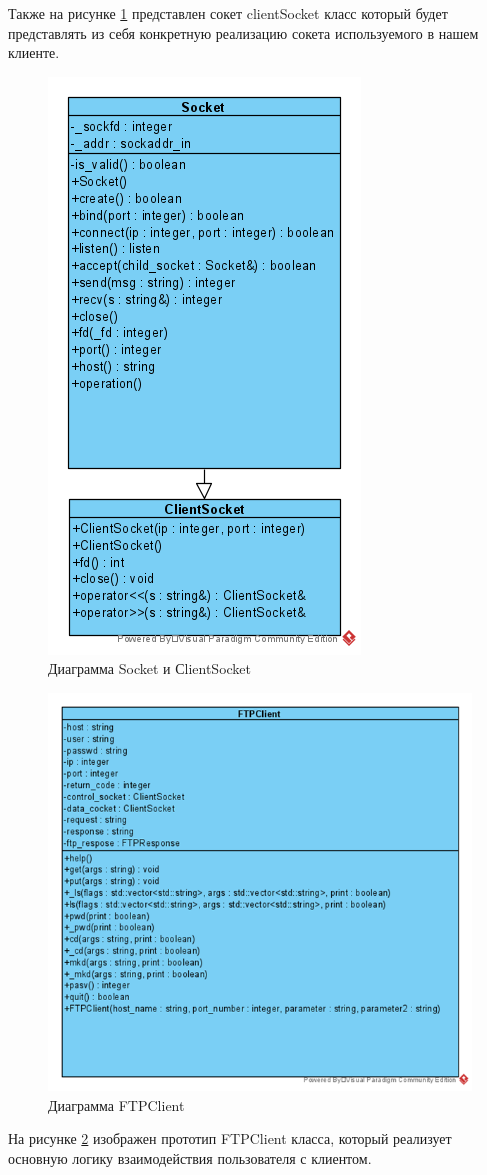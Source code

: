 Также на рисунке \ref{fig:4} представлен сокет clientSocket класс который будет представлять из себя конкретную реализацию сокета используемого в нашем клиенте.

\begin{figure}[H]
	\centering
	\includegraphics[width=0.7\linewidth]{src/img/4}
	\caption{Диаграмма Socket и СlientSocket}
	\label{fig:4}
\end{figure}

\begin{figure}[H]
	\centering
	\includegraphics[width=0.7\linewidth]{src/img/5}
	\caption{Диаграмма FTPClient}
	\label{fig:5}
\end{figure}

На рисунке \ref{fig:5} изображен прототип FTPClient класса, который реализует основную логику взаимодействия пользователя с клиентом.

